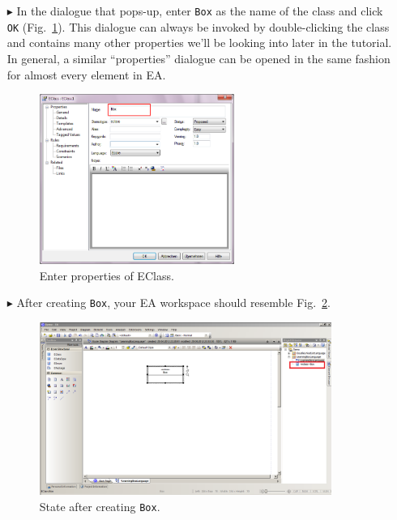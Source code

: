 \begin{enumerate}
\item[$\blacktriangleright$] In the dialogue that pops-up, enter \texttt{Box} as the name of the class and click \texttt{OK} (Fig.~\ref{fig:eclass_properties}).  
This dialogue can always be invoked by double-clicking the class and contains many other properties we'll be looking into later in the tutorial.  
In general, a similar ``properties'' dialogue can be opened in the same fashion for almost every element in EA.

\begin{figure}[htbp]
	\centering
  \includegraphics[width=0.6\textwidth]{pics/memBoxBilder/memBox08.png}
	\caption{Enter properties of EClass.}
	\label{fig:eclass_properties}
\end{figure}

\item[$\blacktriangleright$] After creating \texttt{Box}, your EA workspace should resemble Fig.~\ref{fig:eclass_completed}. 

\begin{figure}[htbp]
	\centering
  \includegraphics[width=0.9\textwidth]{pics/memBoxBilder/memBox09.png}
	\caption{State after creating \texttt{Box}.}
	\label{fig:eclass_completed}
\end{figure}


\end{enumerate}

